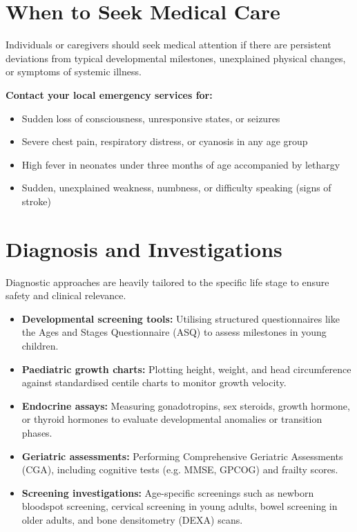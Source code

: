 \section*{When to Seek Medical Care}
Individuals or caregivers should seek medical attention if there are persistent deviations from typical developmental milestones, unexplained physical changes, or symptoms of systemic illness.

\textbf{Contact your local emergency services for:}
\begin{itemize}
    \item Sudden loss of consciousness, unresponsive states, or seizures
    \item Severe chest pain, respiratory distress, or cyanosis in any age group
    \item High fever in neonates under three months of age accompanied by lethargy
    \item Sudden, unexplained weakness, numbness, or difficulty speaking (signs of stroke)
\end{itemize}

\section*{Diagnosis and Investigations}
Diagnostic approaches are heavily tailored to the specific life stage to ensure safety and clinical relevance.
\begin{itemize}
    \item \textbf{Developmental screening tools:} Utilising structured questionnaires like the Ages and Stages Questionnaire (ASQ) to assess milestones in young children.
    \item \textbf{Paediatric growth charts:} Plotting height, weight, and head circumference against standardised centile charts to monitor growth velocity.
    \item \textbf{Endocrine assays:} Measuring gonadotropins, sex steroids, growth hormone, or thyroid hormones to evaluate developmental anomalies or transition phases.
    \item \textbf{Geriatric assessments:} Performing Comprehensive Geriatric Assessments (CGA), including cognitive tests (e.g. MMSE, GPCOG) and frailty scores.
    \item \textbf{Screening investigations:} Age-specific screenings such as newborn bloodspot screening, cervical screening in young adults, bowel screening in older adults, and bone densitometry (DEXA) scans.
\end{itemize}

